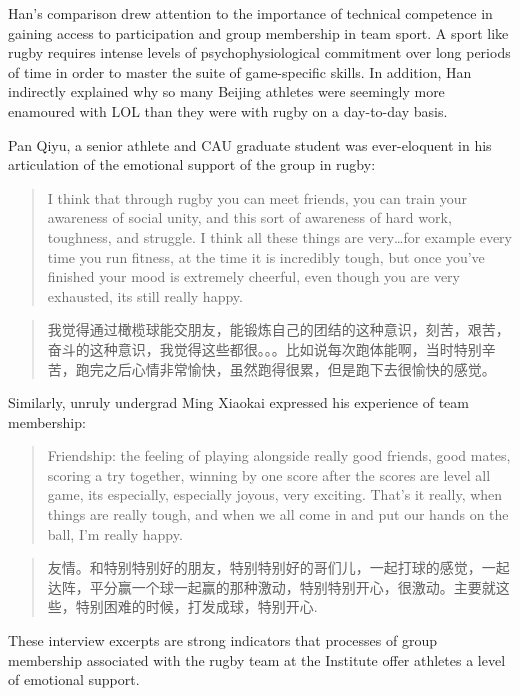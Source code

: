 \begin{CJK}{UTF8}{gbsn}
Han's comparison drew attention to the importance of technical competence in gaining access to participation and group membership in team sport.  A sport like rugby requires intense levels of psychophysiological commitment over long periods of time in order to master the suite of game-specific skills.  In addition, Han indirectly explained why so many Beijing athletes were seemingly more enamoured with LOL than they were with rugby on a day-to-day basis.

Pan Qiyu, a senior athlete and CAU graduate student was ever-eloquent in his articulation of the emotional support of the group in rugby:

    \begin{quote}
      I think that through rugby you can meet friends, you can train your awareness of social unity, and this sort of awareness of hard work, toughness, and struggle. I think all these things are very…for example every time you run fitness, at the time it is incredibly tough, but once you’ve finished your mood is extremely cheerful, even though you are very exhausted, its still really happy.
    \end{quote}

    \begin{quote}
      我觉得通过橄榄球能交朋友，能锻炼自己的团结的这种意识，刻苦，艰苦，奋斗的这种意识，我觉得这些都很。。。比如说每次跑体能啊，当时特别辛苦，跑完之后心情非常愉快，虽然跑得很累，但是跑下去很愉快的感觉。 
    \end{quote}

Similarly, unruly undergrad Ming Xiaokai expressed his experience of team membership:

    \begin{quote}
      Friendship: the feeling of playing alongside really good friends, good mates, scoring a try together, winning by one score after the scores are level all game, its especially, especially joyous, very exciting.  That's it really, when things are really tough, and when we all come in and put our hands on the ball, I’m really happy.
    \end{quote}

    \begin{quote}
       友情。和特别特别好的朋友，特别特别好的哥们儿，一起打球的感觉，一起达阵，平分赢一个球一起赢的那种激动，特别特别开心，很激动。主要就这些，特别困难的时候，打发成球，特别开心.
    \end{quote}

These interview excerpts are strong indicators that processes of group membership associated with the rugby team at the Institute offer athletes a level of emotional support.


\end{CJK}
